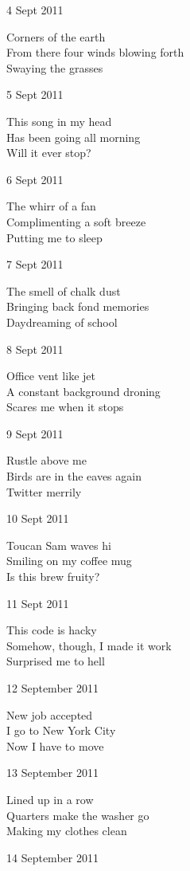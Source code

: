 \documentclass[12pt]{article}
\begin{document}
4 Sept 2011

Corners of the earth \\
From there four winds blowing forth \\
Swaying the grasses

5 Sept 2011

This song in my head \\
Has been going all morning \\
Will it ever stop?

6 Sept 2011

The whirr of a fan \\
Complimenting a soft breeze \\
Putting me to sleep

7 Sept 2011

The smell of chalk dust \\
Bringing back fond memories \\
Daydreaming of school

8 Sept 2011

Office vent like jet \\
A constant background droning \\
Scares me when it stops

9 Sept 2011

Rustle above me \\
Birds are in the eaves again \\
Twitter merrily

\newpage

10 Sept 2011

Toucan Sam waves hi \\
Smiling on my coffee mug \\
Is this brew fruity?

11 Sept 2011

This code is hacky \\
Somehow, though, I made it work \\
Surprised me to hell

12 September 2011

New job accepted \\
I go to New York City \\
Now I have to move

13 September 2011

Lined up in a row \\
Quarters make the washer go \\
Making my clothes clean

14 September 2011
\end{document}

